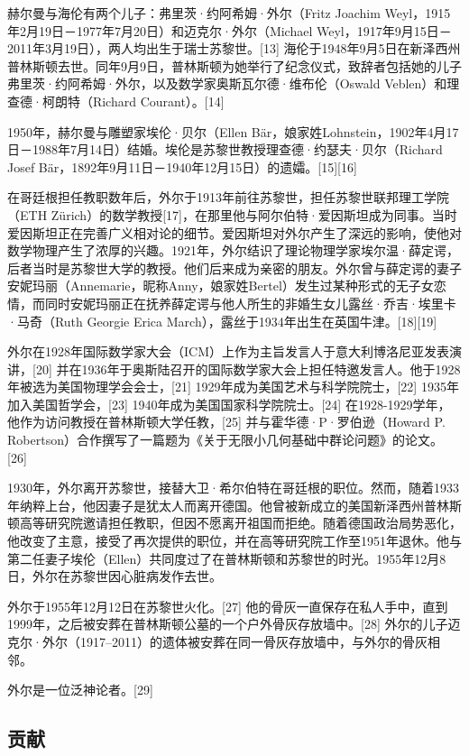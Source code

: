 赫尔曼与海伦有两个儿子：弗里茨·约阿希姆·外尔（Fritz Joachim Weyl，1915年2月19日－1977年7月20日）和迈克尔·外尔（Michael Weyl，1917年9月15日－2011年3月19日），两人均出生于瑞士苏黎世。[13] 海伦于1948年9月5日在新泽西州普林斯顿去世。同年9月9日，普林斯顿为她举行了纪念仪式，致辞者包括她的儿子弗里茨·约阿希姆·外尔，以及数学家奥斯瓦尔德·维布伦（Oswald Veblen）和理查德·柯朗特（Richard Courant）。[14]

1950年，赫尔曼与雕塑家埃伦·贝尔（Ellen Bär，娘家姓Lohnstein，1902年4月17日－1988年7月14日）结婚。埃伦是苏黎世教授理查德·约瑟夫·贝尔（Richard Josef Bär，1892年9月11日－1940年12月15日）的遗孀。[15][16]

在哥廷根担任教职数年后，外尔于1913年前往苏黎世，担任苏黎世联邦理工学院（ETH Zürich）的数学教授[17]，在那里他与阿尔伯特·爱因斯坦成为同事。当时爱因斯坦正在完善广义相对论的细节。爱因斯坦对外尔产生了深远的影响，使他对数学物理产生了浓厚的兴趣。1921年，外尔结识了理论物理学家埃尔温·薛定谔，后者当时是苏黎世大学的教授。他们后来成为亲密的朋友。外尔曾与薛定谔的妻子安妮玛丽（Annemarie，昵称Anny，娘家姓Bertel）发生过某种形式的无子女恋情，而同时安妮玛丽正在抚养薛定谔与他人所生的非婚生女儿露丝·乔吉·埃里卡·马奇（Ruth Georgie Erica March），露丝于1934年出生在英国牛津。[18][19]

外尔在1928年国际数学家大会（ICM）上作为主旨发言人于意大利博洛尼亚发表演讲，[20] 并在1936年于奥斯陆召开的国际数学家大会上担任特邀发言人。他于1928年被选为美国物理学会会士，[21] 1929年成为美国艺术与科学院院士，[22] 1935年加入美国哲学会，[23] 1940年成为美国国家科学院院士。[24] 在1928-1929学年，他作为访问教授在普林斯顿大学任教，[25] 并与霍华德·P·罗伯逊（Howard P. Robertson）合作撰写了一篇题为《关于无限小几何基础中群论问题》的论文。[26]

1930年，外尔离开苏黎世，接替大卫·希尔伯特在哥廷根的职位。然而，随着1933年纳粹上台，他因妻子是犹太人而离开德国。他曾被新成立的美国新泽西州普林斯顿高等研究院邀请担任教职，但因不愿离开祖国而拒绝。随着德国政治局势恶化，他改变了主意，接受了再次提供的职位，并在高等研究院工作至1951年退休。他与第二任妻子埃伦（Ellen）共同度过了在普林斯顿和苏黎世的时光。1955年12月8日，外尔在苏黎世因心脏病发作去世。

外尔于1955年12月12日在苏黎世火化。[27] 他的骨灰一直保存在私人手中，直到1999年，之后被安葬在普林斯顿公墓的一个户外骨灰存放墙中。[28] 外尔的儿子迈克尔·外尔（1917–2011）的遗体被安葬在同一骨灰存放墙中，与外尔的骨灰相邻。

外尔是一位泛神论者。[29]
\subsection{贡献}